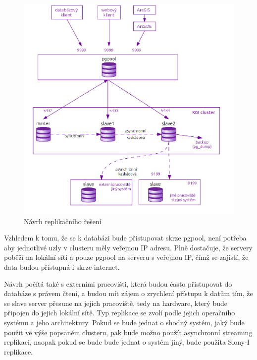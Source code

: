         \begin{figure}[H]
          \label{oNavrhKatedra}
          \centering
          \includegraphics[scale=1]{../../../grafy/obr/schema_navrhKatedra2.png}
          \caption {Návrh replikačního řešení}
        \end{figure}

        Vzhledem k tomu, že se k databázi bude přistupovat skrze pgpool, není potřeba aby jednotlivé uzly v clusteru měly veřejnou IP adresu. Plně dostačuje, že servery poběží na lokální síti a pouze pgpool na serveru s veřejnou IP, čímž se zajistí, že data budou přístupná i skrze internet. 

Návrh počítá také s externími pracovišti, která budou často přistupovat do databáze s právem čtení, a budou mít zájem o zrychlení přístupu k datům tím, že se slave server přesune na jejich pracoviště, tedy na hardware, který bude připojen do jejich lokální sítě. Typ replikace se zvolí podle jejich operačního systému a jeho architektury. Pokud se bude jednat o shodný systém, jaký bude použit ve výše popsaném clusteru, pak bude možno použít asynchronní streaming replikaci, naopak pokud se bude bude jednat o systém jiný, bude použita Slony-I replikace.
